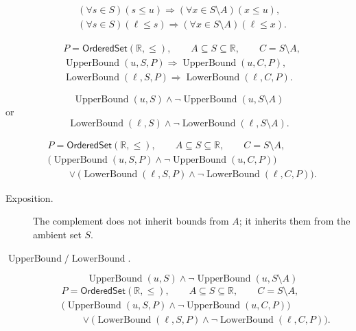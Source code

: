 \begin{remark*}
\[
\begin{aligned}
&(\forall s\in S)(s\leq u)
\Longrightarrow(\forall x\in S\setminus A)(x\leq u),\\
&(\forall s\in S)(\ell\leq s)
\Longrightarrow(\forall x\in S\setminus A)(\ell\leq x).
\end{aligned}
\]
\end{remark*}

\begin{remark*}
\[
\begin{aligned}
&P=\mathsf{OrderedSet}(\mathbb{R},\leq),\qquad A\subseteq S\subseteq\mathbb{R},\qquad C=S\setminus A,\\
&\operatorname{UpperBound}(u,S,P)\Longrightarrow\operatorname{UpperBound}(u,C,P),\\
&\operatorname{LowerBound}(\ell,S,P)\Longrightarrow\operatorname{LowerBound}(\ell,C,P).
\end{aligned}
\]
\end{remark*}

\begin{remark*}
\[
\operatorname{UpperBound}(u,S)\land\neg\operatorname{UpperBound}(u,S\setminus A)
\]
or
\[
\operatorname{LowerBound}(\ell,S)\land\neg\operatorname{LowerBound}(\ell,S\setminus A).
\]
\end{remark*}

\begin{remark*}
\[
\begin{aligned}
&P=\mathsf{OrderedSet}(\mathbb{R},\leq),\qquad A\subseteq S\subseteq\mathbb{R},\qquad C=S\setminus A,\\
&\bigl(\operatorname{UpperBound}(u,S,P)\land\neg\operatorname{UpperBound}(u,C,P)\bigr)\\
&\qquad{}\lor
\bigl(\operatorname{LowerBound}(\ell,S,P)\land\neg\operatorname{LowerBound}(\ell,C,P)\bigr).
\end{aligned}
\]
\end{remark*}

\begin{remark*}
\begin{description}
\item[Exposition.]
The complement does not inherit bounds from $A$; it inherits them from the
ambient set $S$.


  \item[\(\operatorname{UpperBound} / \operatorname{LowerBound}.\)]
  \[
\operatorname{UpperBound}(u,S)\land\neg\operatorname{UpperBound}(u,S\setminus A)
\]
\[
\begin{aligned}
&P=\mathsf{OrderedSet}(\mathbb{R},\leq),\qquad A\subseteq S\subseteq\mathbb{R},\qquad C=S\setminus A,\\
&\bigl(\operatorname{UpperBound}(u,S,P)\land\neg\operatorname{UpperBound}(u,C,P)\bigr)\\
&\qquad{}\lor
\bigl(\operatorname{LowerBound}(\ell,S,P)\land\neg\operatorname{LowerBound}(\ell,C,P)\bigr).
\end{aligned}
\]
\end{description}
\end{remark*}

